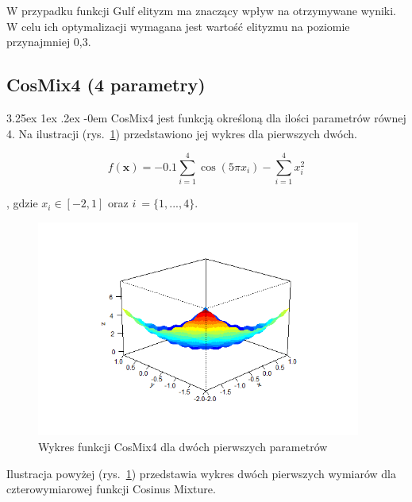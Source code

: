 \documentclass[11pt, a4paper]{article}
\makeatletter
\newcommand{\fbi}{\leavevmode{\parindent=1em\indent}}
\renewcommand\paragraph{\@startsection{paragraph}{5}{\z@}
  {3.25ex \@plus1ex \@minus.2ex}
  {-0em}
  {\normalfont\normalsize\bfseries}}
\makeatother
\begin{document}
\fbi
W przypadku funkcji Gulf elityzm ma znaczący wpływ na otrzymywane wyniki. W celu ich optymalizacji wymagana jest wartość elityzmu na poziomie przynajmniej 0,3.

\newpage
\subsection{CosMix4 (4 parametry)}
\paragraph{}
CosMix4 jest funkcją określoną dla ilości parametrów równej 4. Na ilustracji (rys.~\ref{fig:cosmix41}) przedstawiono jej wykres dla pierwszych dwóch.

\begin{equation}\label{eq:cosmix4}
f(\boldsymbol{x}) = -0.1 \sum_{i=1}^{4} \cos (5 \pi x_i) - \sum_{i=1}^{4} x_i^2
\end{equation}

, gdzie $ x_i \in [-2, 1] $ oraz $ i~= \{1, ... ,4\} $.

\begin{figure}[H]
	\begin{center}
		\includegraphics[width=0.95\textwidth]{./assets/CosMix41.png}
		\caption{Wykres funkcji CosMix4 dla dwóch pierwszych parametrów}
		\label{fig:cosmix41}
	\end{center}
\end{figure}

\fbi
Ilustracja powyżej (rys.~\ref{fig:cosmix41}) przedstawia wykres dwóch pierwszych wymiarów dla czterowymiarowej funkcji Cosinus Mixture. 
\end{document}
